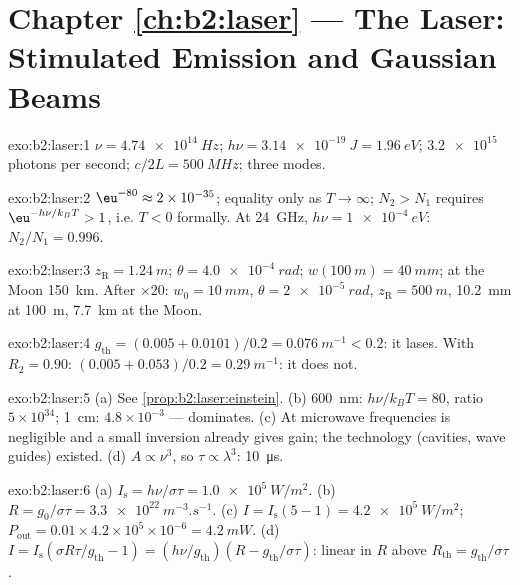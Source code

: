 \section*{Chapter \ref{ch:b2:laser} --- The Laser: Stimulated Emission and Gaussian Beams}

\begin{solution}{exo:b2:laser:1}
$\nu = \qty{4.74e14}{Hz}$; $h\nu = \qty{3.14e-19}{J} = \qty{1.96}{eV}$;
$\qty{3.2e15}{}$ photons per second; $c/2L = \qty{500}{MHz}$; three
modes.
\end{solution}

\begin{solution}{exo:b2:laser:2}
$\eu^{-80} \approx 2 \times 10^{-35}$; equality only as $T \to \infty$;
$N_2 > N_1$ requires $\eu^{-h\nu/k_BT} > 1$, i.e. $T < 0$ formally. At
\qty{24}{GHz}, $h\nu = \qty{1e-4}{eV}$: $N_2/N_1 = 0.996$.
\end{solution}

\begin{solution}{exo:b2:laser:3}
$z_{\text{R}} = \qty{1.24}{m}$; $\theta = \qty{4.0e-4}{rad}$; $w(\qty{100}{m}) =
\qty{40}{mm}$; at the Moon \qty{150}{km}. After $\times 20$: $w_0 = \qty{10}{mm}$,
$\theta = \qty{2e-5}{rad}$, $z_{\text{R}} = \qty{500}{m}$, \qty{10.2}{mm} at
\qty{100}{m}, \qty{7.7}{km} at the Moon.
\end{solution}

\begin{solution}{exo:b2:laser:4}
$g_{\text{th}} = (0.005 + 0.0101)/0.2 = \qty{0.076}{m^{-1}} < 0.2$: it
lases. With $R_2 = 0.90$: $(0.005 + 0.053)/0.2 = \qty{0.29}{m^{-1}}$: it
does not.
\end{solution}

\begin{solution}{exo:b2:laser:5}
(a) See \cref{prop:b2:laser:einstein}. (b) \qty{600}{nm}: $h\nu/k_BT
= 80$, ratio $5 \times 10^{34}$; \qty{1}{cm}: $4.8 \times 10^{-3}$ ---
 dominates. (c) At microwave frequencies
 is negligible and a small inversion already gives
gain; the technology (cavities, wave guides) existed. (d) $A \propto
\nu^3$, so $\tau \propto \lambda^3$: \qty{10}{\micro s}.
\end{solution}

\begin{solution}{exo:b2:laser:6}
(a) $I_{\text{s}} = h\nu/\sigma\tau = \qty{1.0e5}{W/m^2}$. (b) $R =
g_0/\sigma\tau = \qty{3.3e22}{m^{-3}.s^{-1}}$. (c) $I = I_{\text{s}}(5 - 1) =
\qty{4.2e5}{W/m^2}$; $P_{\text{out}} = 0.01 \times 4.2 \times 10^5 \times
10^{-6} = \qty{4.2}{mW}$. (d) $I = I_{\text{s}}(\sigma R\tau/g_{\text{th}}
- 1) = (h\nu/g_{\text{th}})(R - g_{\text{th}}/\sigma\tau)$: linear in $R$
above $R_{\text{th}} = g_{\text{th}}/\sigma\tau$.
\end{solution}

